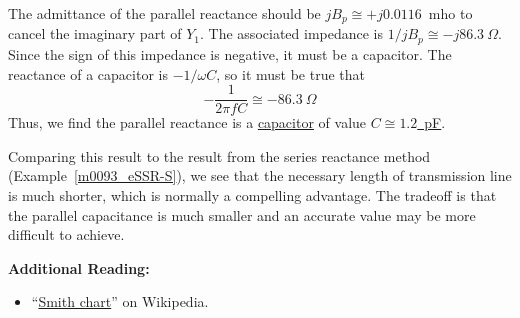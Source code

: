 \begin{example}
\begin{mdframed}[backgroundcolor=brown!20,linecolor=brown!20]
The admittance of the parallel reactance should be $jB_p \cong +j0.0116$~mho to cancel the imaginary part of $Y_1$.
The associated impedance is $1/jB_p \cong -j86.3~\Omega$.
Since the sign of this impedance is negative, it must be a capacitor.
The reactance of a capacitor is $-1/\omega C$, so it must be true that
%
\begin{equation}
-\frac{1}{2\pi f C} \cong -86.3~\Omega
\end{equation}  
%
Thus, we find the parallel reactance is a \underline{capacitor} of value \underline{$C\cong 1.2$~pF}.

\end{mdframed}\end{example}


Comparing this result to the result from the series reactance method (Example~\ref{m0093_eSSR-S}), we see that the necessary length of transmission line is much shorter, which is normally a compelling advantage.  The tradeoff is that the parallel capacitance is much smaller and an accurate value may be more difficult to achieve.

{\bf Additional Reading:}
\begin{itemize}
\item ``\href{https://en.wikipedia.org/wiki/Smith_chart}{\small Smith chart}'' on Wikipedia.
\end{itemize}


